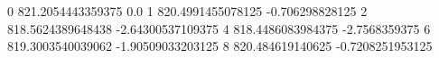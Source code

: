 0 821.2054443359375 0.0
1 820.4991455078125 -0.706298828125
2 818.5624389648438 -2.64300537109375
4 818.4486083984375 -2.7568359375
6 819.3003540039062 -1.90509033203125
8 820.484619140625 -0.7208251953125

